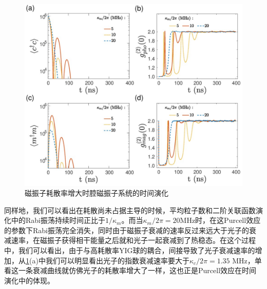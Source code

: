 \begin{figure}[htbp]
	\centering
	\includegraphics[width=2\basefigurewidth]{./figure/5_13}
	\caption{磁振子耗散率增大时腔磁振子系统的时间演化} 
	\label{EvolutionPurcellKmVary}
\end{figure}
同样地，我们可以看出在耗散尚未占据主导的时候，平均粒子数和二阶关联函数演化中的Rabi振荡持续时间正比于$1/\kappa_m$。而当$\kappa_m/2\pi=20$MHz时，在这Purcell效应的参数下Rabi振荡完全消失，同时由于磁振子衰减的速率反过来远大于光子的衰减速率，在磁振子获得相干能量之后就和光子一起衰减到了热稳态。在这个过程中，我们可以看出，由于与高耗散率YIG球的耦合，间接导致了光子衰减速率的增加，从\ref{EvolutionPurcellKmVary}(a)中我们可以明显看出光子的指数衰减速率要大于$\kappa_c/2\pi=1.35$ MHz，单看这一条衰减曲线就仿佛光子的耗散率增大了一样，这也正是Purcell效应在时间演化中的体现。
